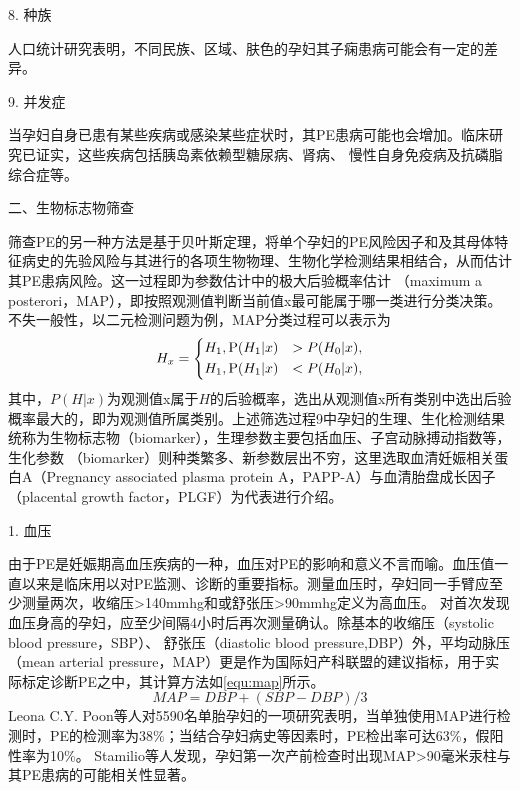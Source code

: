 8. 种族

人口统计研究表明，不同民族、区域、肤色的孕妇其子痫患病可能会有一定的差异\cite{Ghosh2014,Khalil2013}。

9. 并发症

当孕妇自身已患有某些疾病或感染某些症状时，其PE患病可能也会增加\cite{FIGO,Ray2016,OAG9}。临床研究已证实，这些疾病包括胰岛素依赖型糖尿病\cite{Lee2000,Garner1990}、肾病\cite{Martinell1990}、
慢性自身免疫病\cite{Stamilio2000}及抗磷脂综合症\cite{Dreyfus2001,Marchetti2016}等。

二、生物标志物筛查

筛查PE的另一种方法是基于贝叶斯定理，将单个孕妇的PE风险因子和及其母体特征病史的先验风险与其进行的各项生物物理、生物化学检测结果相结合，从而估计其PE患病风险\cite{FIGO}。这一过程即为参数估计中的极大后验概率估计
（maximum a posterori，MAP），即按照观测值判断当前值x最可能属于哪一类进行分类决策\cite{Qiu2012}。不失一般性，以二元检测问题为例，MAP分类过程可以表示为
\begin{equation}
    \label{equ:maxap}
    H_{x}=
    \left \{
    \begin{aligned}
        &H_{1}, \text P(H_{1}|x)&>P(H_{0}|x), \\
        &H_{1}, \text P(H_{1}|x)&<P(H_{0}|x),
    \end{aligned}
    \right.  
\end{equation}
其中，$P(H|x)$为观测值x属于$H$的后验概率，选出从观测值x所有类别中选出后验概率最大的，即为观测值所属类别。上述筛选过程9中孕妇的生理、生化检测结果统称为生物标志物（biomarker），生理参数主要包括血压、子宫动脉搏动指数等，生化参数
（biomarker）则种类繁多、新参数层出不穷\cite{Rene2008,Zhong2015,Zeisler2016,Rana2012}，这里选取血清妊娠相关蛋白A（Pregnancy associated plasma protein A，PAPP-A）与血清胎盘成长因子（placental growth factor，PLGF）为代表进行介绍。

1. 血压

由于PE是妊娠期高血压疾病的一种\cite{OAG9,HDASOM,2000s1}，血压对PE的影响和意义不言而喻。血压值一直以来是临床用以对PE监测、诊断的重要指标。测量血压时，孕妇同一手臂应至少测量两次，收缩压>140mmhg和或舒张压>90mmhg定义为高血压。
对首次发现血压身高的孕妇，应至少间隔4小时后再次测量确认\cite{OAG9}。除基本的收缩压（systolic blood pressure，SBP）、
舒张压（diastolic blood pressure,DBP）外，平均动脉压（mean arterial pressure，MAP）更是作为国际妇产科联盟的建议指标，用于实际标定诊断PE之中，其计算方法如\autoref{equ:map}所示\cite{FIGO}。
\begin{equation}
    \label{equ:map}
    MAP=DBP+(SBP-DBP)/3
\end{equation}
Leona C.Y. Poon\cite{Poon2008}等人对5590名单胎孕妇的一项研究表明，当单独使用MAP进行检测时，PE的检测率为38\%；当结合孕妇病史等因素时，PE检出率可达63\%，假阳性率为10\%。
Stamilio等人\cite{Stamilio2000}发现，孕妇第一次产前检查时出现MAP>90毫米汞柱与其PE患病的可能相关性显著。

